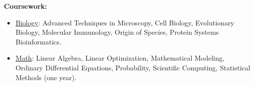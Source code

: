 \textbf{Coursework:}

\begin{itemize}[noitemsep]
\item \ul{Biology}: Advanced Techniques in Microscopy, Cell Biology, Evolutionary Biology, Molecular Immunology, Origin of Species, Protein Systems Bioinformatics.
\item \ul{Math}: Linear Algebra, Linear Optimization, Mathematical Modeling, Ordinary Differential Equations, Probability, Scientific Computing, Statistical Methods (one year).
\end{itemize}